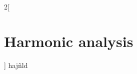\documentclass[../../../main.tex]{subfiles}
\begin{document}
\renewcommand{\col}{\ana}
\begin{multicols}{2}[\section{Harmonic analysis}]
  hajñld
\end{multicols}
\end{document}
